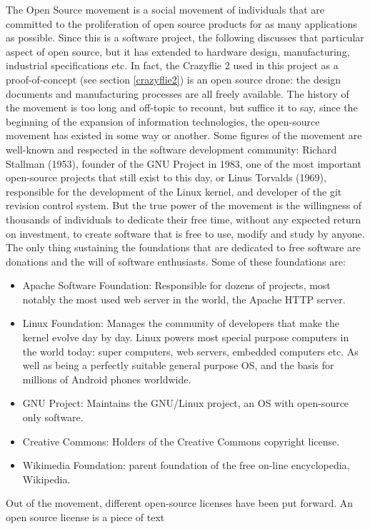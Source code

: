 The Open Source movement is a social movement of individuals that are committed to the proliferation of open source 
products for as many applications as possible. Since this is a software project, the following discusses that particular 
aspect of open source, but it has extended to hardware design, manufacturing, industrial specifications etc. In fact, the 
Crazyflie 2 used in this project as a proof-of-concept (see section \ref{crazyflie2}) is an open source drone: the design 
documents and manufacturing processes are all freely available. The history of the movement is too long and off-topic to 
recount, but suffice it to say, since the beginning of the expansion of information technologies, the open-source movement 
has existed in some way or another. Some figures of the movement are well-known and respected in the software development 
community: Richard Stallman (1953), founder of the GNU Project in 1983, one of the most important open-source projects that 
still exist to this day, or Linus Torvalds (1969), responsible for the development of the Linux kernel, and developer of 
the git revision control system. But the true power of the movement is the willingness of thousands of individuals to 
dedicate their free time, without any expected return on investment, to create software that is free to use, modify and 
study by anyone. The only thing sustaining the foundations that are dedicated to free software are donations and the will 
of software enthusiasts. Some of these foundations are:
\begin{itemize}
	\item Apache Software Foundation: Responsible for dozens of projects, most notably the most used web server in the 
	world, the Apache HTTP server.
	\item Linux Foundation: Manages the community of developers that make the kernel evolve day by day. Linux powers most 
	special purpose computers in the world today: super computers, web servers, embedded computers etc. As well as being a 
	perfectly suitable general purpose OS, and the basis for millions of Android phones worldwide.
	\item GNU Project: Maintains the GNU/Linux project, an OS with open-source only software.
	\item Creative Commons: Holders of the Creative Commons copyright license.
	\item Wikimedia Foundation: parent foundation of the free on-line encyclopedia, Wikipedia. 
\end{itemize}
Out of the movement, different open-source licenses have been put forward. An open source license is a piece of text 
